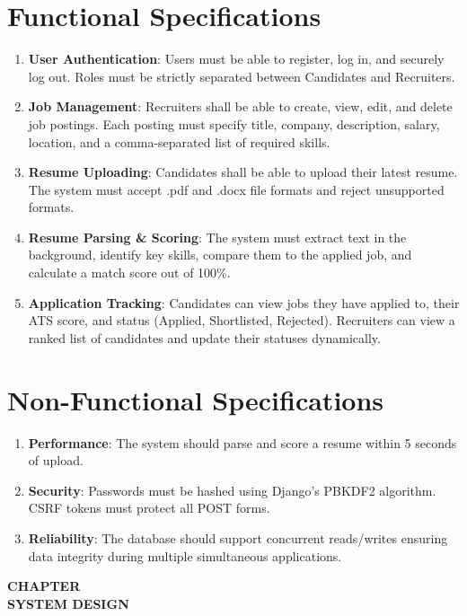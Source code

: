 \documentclass[12pt,a4paper]{report}
\newcommand{\chaptertitlepage}[1]{%
\cleardoublepage
\thispagestyle{empty}
\null
\vfill
\begin{center}
{\fontsize{16pt}{18pt}\selectfont\bfseries
CHAPTER \thechapter}\\[0.5cm]
{\fontsize{16pt}{18pt}\selectfont\bfseries
#1}
\end{center}
\vfill
\null
\clearpage
}
\begin{document}
\section{Functional Specifications}
\begin{enumerate}
\item \textbf{User Authentication}: Users must be able to register, log in, and securely log out. Roles must be strictly separated between Candidates and Recruiters.
\item \textbf{Job Management}: Recruiters shall be able to create, view, edit, and delete job postings. Each posting must specify title, company, description, salary, location, and a comma-separated list of required skills.
\item \textbf{Resume Uploading}: Candidates shall be able to upload their latest resume. The system must accept .pdf and .docx file formats and reject unsupported formats.
\item \textbf{Resume Parsing & Scoring}: The system must extract text in the background, identify key skills, compare them to the applied job, and calculate a match score out of 100\%.
\item \textbf{Application Tracking}: Candidates can view jobs they have applied to, their ATS score, and status (Applied, Shortlisted, Rejected). Recruiters can view a ranked list of candidates and update their statuses dynamically.
\end{enumerate}

\section{Non-Functional Specifications}
\begin{enumerate}
\item \textbf{Performance}: The system should parse and score a resume within 5 seconds of upload.
\item \textbf{Security}: Passwords must be hashed using Django's PBKDF2 algorithm. CSRF tokens must protect all POST forms.
\item \textbf{Reliability}: The database should support concurrent reads/writes ensuring data integrity during multiple simultaneous applications.
\end{enumerate}

\chaptertitlepage{SYSTEM DESIGN}
\end{document}
